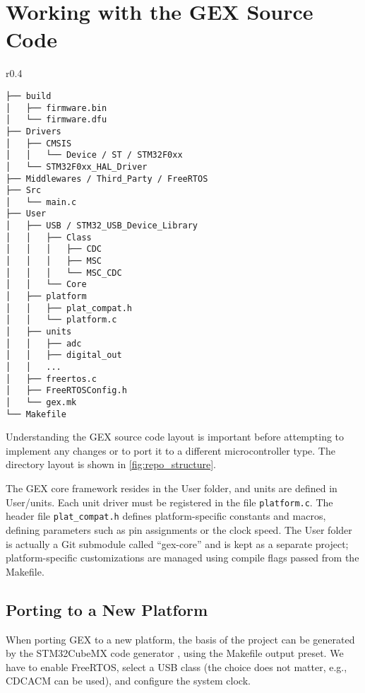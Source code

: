 \chapter{Working with the GEX Source Code}

\begin{wrapfigure}[20]{r}{0.4\textwidth}
	\scriptsize\vspace{-3em}
	\begin{verbatim}
├── build
│   ├── firmware.bin
│   └── firmware.dfu
├── Drivers
│   ├── CMSIS
│   │   └── Device / ST / STM32F0xx
│   └── STM32F0xx_HAL_Driver
├── Middlewares / Third_Party / FreeRTOS
├── Src
│   └── main.c
├── User
│   ├── USB / STM32_USB_Device_Library
│   │   ├── Class
│   │   │   ├── CDC
│   │   │   ├── MSC
│   │   │   └── MSC_CDC
│   │   └── Core
│   ├── platform
│   │   ├── plat_compat.h
│   │   └── platform.c
│   ├── units
│   │   ├── adc
│   │   ├── digital_out
│   │   ...
│   ├── freertos.c
│   ├── FreeRTOSConfig.h
│   └── gex.mk
└── Makefile
	\end{verbatim}
	\vspace{-1em}
	\caption{\label{fig:repo_structure} General structure of the source code repository}
\end{wrapfigure}

Understanding the GEX source code layout is important before attempting to implement any changes or to port it to a different microcontroller type. The directory layout is shown in \cref{fig:repo_structure}. 

The GEX core framework resides in the User folder, and units are defined in User/units. Each unit driver must be registered in the file \verb|platform.c|. The header file \verb|plat_compat.h| defines platform-specific constants and macros, defining parameters such as pin assignments or the clock speed. The User folder is actually a Git submodule called ``gex-core'' and is kept as a separate project; platform-specific customizations are managed using compile flags passed from the Makefile.

\section{Porting to a New Platform}

When porting GEX to a new platform, the basis of the project can be generated by the STM32CubeMX code generator \cite{cubemx}, using the Makefile output preset. We have to enable FreeRTOS, select a USB class (the choice does not matter, e.g., \gls{CDCACM} can be used), and configure the system clock. 

